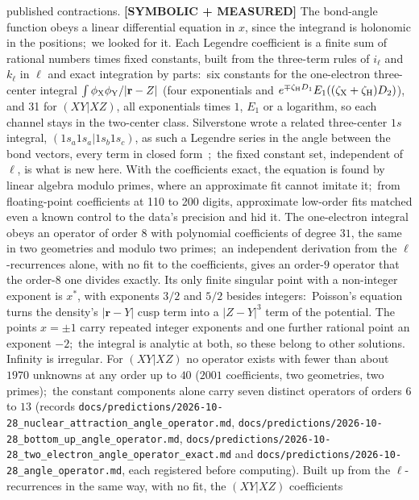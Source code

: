 \documentclass[aps,pra,twocolumn,superscriptaddress,longbibliography]{revtex4-2}
\begin{document}
published contractions.
\textbf{[SYMBOLIC + MEASURED]} The bond-angle function obeys a linear differential equation in
$x$, since the integrand is holonomic in the positions;\ we looked for it.  Each Legendre
coefficient is a finite sum of rational numbers times fixed constants, built from the
three-term rules of $i_\ell$ and $k_\ell$ in $\ell$ and exact integration by parts:\ six constants
for the one-electron three-center integral $\int\phi_{\rm X}\phi_{\rm Y}/|\mathbf{r}-Z|$ (four
exponentials and $e^{\mp\zeta_{\rm H}D_1}E_1((\zeta_{\rm X}+\zeta_{\rm H})D_2)$), and 31 for
$(XY|XZ)$, all exponentials times $1$, $E_1$ or a logarithm, so each channel stays in the
two-center class.  Silverstone wrote a related three-center $1s$ integral,
$(1s_a1s_a|1s_b1s_c)$, as such a Legendre series in the angle between the bond vectors, every
term in closed form~\cite{silverstone1967pnas};\ the fixed constant set, independent of $\ell$,
is what is new here.  With the coefficients exact, the equation is found by linear algebra modulo
primes, where an approximate fit cannot imitate it;\ from floating-point coefficients at 110 to 200
digits, approximate low-order fits matched even a known control to the data's precision and
hid it.  The one-electron integral obeys an operator of order $8$ with polynomial coefficients
of degree $31$, the same in two geometries and modulo two primes;\ an independent derivation
from the $\ell$-recurrences alone, with no fit to the coefficients, gives an order-$9$ operator
that the order-$8$ one divides exactly.  Its only finite singular point with a non-integer
exponent is $x^{*}$, with exponents $3/2$ and $5/2$ besides integers:\ Poisson's equation turns
the density's $|\mathbf{r}-Y|$ cusp term into a $|Z-Y|^{3}$ term of the potential.  The points
$x=\pm1$ carry repeated integer exponents and one further rational point an exponent $-2$;\ the
integral is analytic at both, so these belong to other solutions.  Infinity is irregular.  For
$(XY|XZ)$ no operator exists with fewer than about $1970$ unknowns at any order up to $40$
($2001$ coefficients, two geometries, two primes);\ the constant components alone carry seven
distinct operators of orders $6$ to $13$ (records
\texttt{docs/predictions/2026-10-28\_nuclear\_attraction\_angle\_operator.md},
\texttt{docs/predictions/2026-10-28\_bottom\_up\_angle\_operator.md},
\texttt{docs/predictions/2026-10-28\_two\_electron\_angle\_operator\_exact.md} and
\texttt{docs/predictions/2026-10-28\_angle\_operator.md}, each registered before computing).
Built up from the $\ell$-recurrences in the same way, with no fit, the $(XY|XZ)$ coefficients
\end{document}

